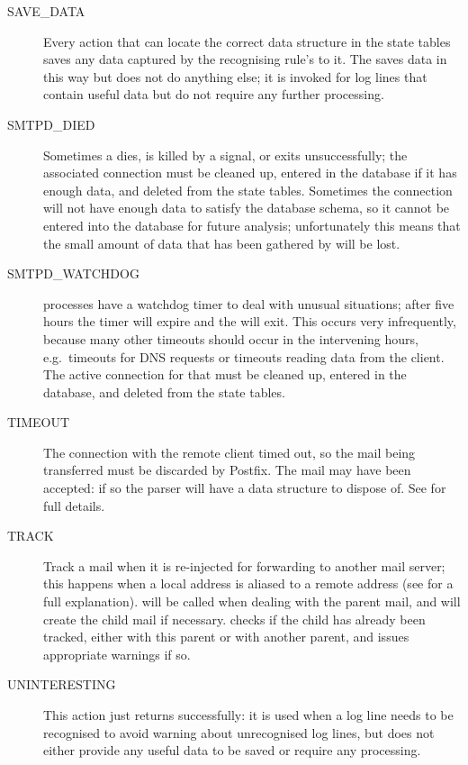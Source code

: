 \begin{description}
    \item [SAVE\_DATA] Every action that can locate the correct data
        structure in the state tables saves any data captured by the
        recognising rule's  to it.  The 
        saves data in this way but does not do anything else; it is invoked
        for log lines that contain useful data but do not require any
        further processing.

    \item [SMTPD\_DIED] Sometimes a  dies, is killed by a
        signal, or exits unsuccessfully; the associated connection must be
        cleaned up, entered in the database if it has enough data, and
        deleted from the state tables.  Sometimes the connection will not
        have enough data to satisfy the database schema, so it cannot be
        entered into the database for future analysis; unfortunately this
        means that the small amount of data that has been gathered by
        \parsername{} will be lost.

    \item [SMTPD\_WATCHDOG]  processes have a watchdog timer
        to deal with unusual situations; after five hours the timer will
        expire and the  will exit.  This occurs very
        infrequently, because many other timeouts should occur in the
        intervening hours, e.g.\ timeouts for DNS requests or timeouts
        reading data from the client.  The active connection for that
         must be cleaned up, entered in the database, and
        deleted from the state tables.

    \item [TIMEOUT] The connection with the remote client timed out, so the
        mail being transferred must be discarded by Postfix.  The mail may
        have been accepted: if so the parser will have a data structure to
        dispose of.  See  for full
        details.

    \item [TRACK] Track a mail when it is re-injected for forwarding to
        another mail server; this happens when a local address is aliased
        to a remote address (see  for
        a full explanation).   will be called when dealing
        with the parent mail, and will create the child mail if necessary.
         checks if the child has already been tracked, either
        with this parent or with another parent, and issues appropriate
        warnings if so.

    \item [UNINTERESTING] This action just returns successfully: it is used
        when a log line needs to be recognised to avoid warning about
        unrecognised log lines, but does not either provide any useful data
        to be saved or require any processing.

\end{description}

